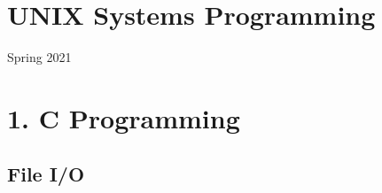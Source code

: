 \documentclass[]{article}
\date{}
\begin{document}
\section{\texorpdfstring{\textbf{UNIX Systems
Programming}}{UNIX Systems Programming}}\label{header-n0}

Spring 2021

\tableofcontents

\section{\texorpdfstring{\textbf{1. C
Programming}}{1. C Programming}}\label{header-n7}

\subsection{\texorpdfstring{\textbf{File
I/O}}{File I/O}}\label{header-n8}
\end{document}
